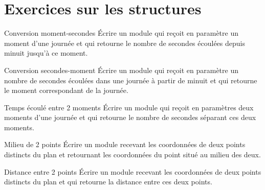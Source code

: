 \section{Exercices sur les structures}

\begin{Exercice}{Conversion moment-secondes}
	Écrire un module qui reçoit en paramètre un
	moment d’une journée et qui retourne le nombre de secondes écoulées
	depuis minuit jusqu’à ce moment.
\end{Exercice}

\begin{Exercice}{Conversion secondes-moment}
	Écrire un module qui reçoit en paramètre un
	nombre de secondes écoulées dans une journée à partir de minuit et qui
	retourne le moment correspondant de la journée.
\end{Exercice}

\begin{Exercice}{Temps écoulé entre 2 moments}
	Écrire un module qui reçoit en paramètres deux
	moments d’une journée et qui retourne le nombre de secondes séparant
	ces deux moments.
\end{Exercice}

\begin{Exercice}{Milieu de 2 points}
	Écrire un module recevant les coordonnées de
	deux points distincts du plan et retournant les coordonnées du point
	situé au milieu des deux.
\end{Exercice}

\begin{Exercice}{Distance entre 2 points}
	Écrire un module recevant les coordonnées de
	deux points distincts du plan et qui retourne
	la distance entre ces deux points.
\end{Exercice}

